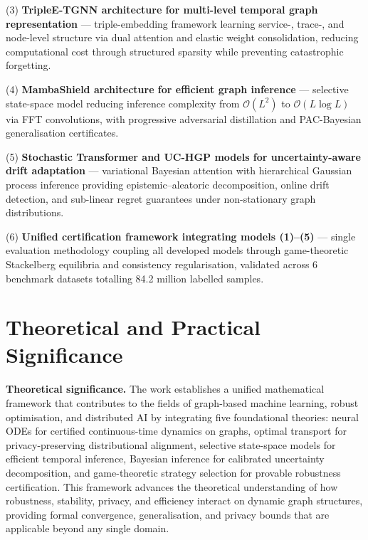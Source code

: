 (3) \textbf{TripleE-TGNN architecture for multi-level temporal graph representation} --- triple-embedding framework learning service-, trace-, and node-level structure via dual attention and elastic weight consolidation, reducing computational cost through structured sparsity while preventing catastrophic forgetting.

(4) \textbf{MambaShield architecture for efficient graph inference} --- selective state-space model reducing inference complexity from $\mathcal{O}(L^{2})$ to $\mathcal{O}(L\log L)$ via FFT convolutions, with progressive adversarial distillation and PAC-Bayesian generalisation certificates.

(5) \textbf{Stochastic Transformer and UC-HGP models for uncertainty-aware drift adaptation} --- variational Bayesian attention with hierarchical Gaussian process inference providing epistemic--aleatoric decomposition, online drift detection, and sub-linear regret guarantees under non-stationary graph distributions.

(6) \textbf{Unified certification framework integrating models (1)--(5)} --- single evaluation methodology coupling all developed models through game-theoretic Stackelberg equilibria and consistency regularisation, validated across 6 benchmark datasets totalling 84.2 million labelled samples.


\section*{Theoretical and Practical Significance}

\textbf{Theoretical significance.} The work establishes a unified mathematical framework that contributes to the fields of graph-based machine learning, robust optimisation, and distributed AI by integrating five foundational theories: neural ODEs for certified continuous-time dynamics on graphs, optimal transport for privacy-preserving distributional alignment, selective state-space models for efficient temporal inference, Bayesian inference for calibrated uncertainty decomposition, and game-theoretic strategy selection for provable robustness certification. This framework advances the theoretical understanding of how robustness, stability, privacy, and efficiency interact on dynamic graph structures, providing formal convergence, generalisation, and privacy bounds that are applicable beyond any single domain.

